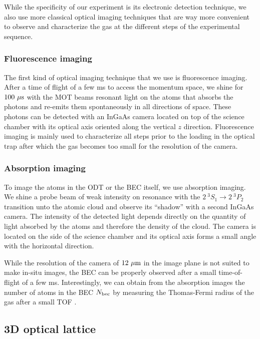 While the specificity of our experiment is its electronic detection technique, we also use more classical optical imaging techniques that are way more convenient to observe and characterize the gas at the different steps of the experimental sequence.

\subsubsection{Fluorescence imaging}

The first kind of optical imaging technique that we use is fluorescence imaging. After a time of flight of a few ms to access the momentum space, we shine for $100 \ \mu \rm{s}$ with the MOT beams resonant light on the atoms that absorbs the photons and re-emits them spontaneously in all directions of space. These photons can be detected with an InGaAs camera located on top of the science chamber with its optical axis oriented along the vertical $z$ direction. Fluorescence imaging is mainly used to characterize all steps prior to the loading in the optical trap after which the gas becomes too small for the resolution of the camera.
 
\subsubsection{Absorption imaging}

To image the atoms in the ODT or the BEC itself, we use absorption imaging. We shine a probe beam of weak intensity on resonance with the $2 \ ^3 S_1 \rightarrow 2 \ ^3 P_2$ transition unto the atomic cloud and observe its ``shadow'' with a second InGaAs camera. The intensity of the detected light depends directly on the quantity of light absorbed by the atoms and therefore the density of the cloud. The camera is located on the side of the science chamber and its optical axis forms a small angle with the horizontal direction.

While the resolution of the camera of $12 \ \mu \rm{m}$ in the image plane is not suited to make in-situ images, the BEC can be properly observed after a small time-of-flight of a few ms. Interestingly, we can obtain from the absorption images the number of atoms in the BEC $N_{\rm{bec}}$ by measuring the Thomas-Fermi radius of the gas after a small TOF \cite{bouton_these}.



\subsection{3D optical lattice}

